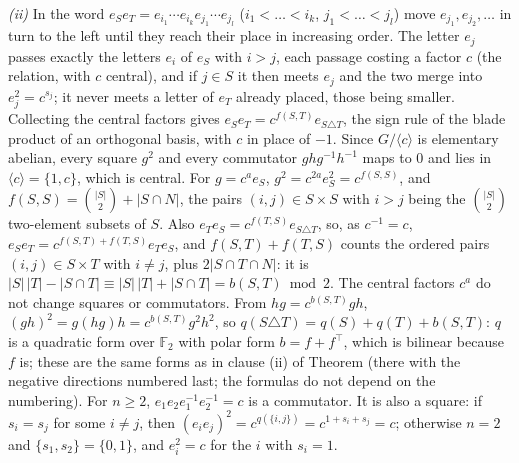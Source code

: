 \emph{(ii)} In the word $e_{S}e_{T} = e_{i_{1}}\cdots e_{i_{k}}e_{j_{1}}\cdots e_{j_{l}}$ ($i_{1} < \dots < i_{k}$, $j_{1} < \dots < j_{l}$) move $e_{j_{1}}, e_{j_{2}}, \dots$ in turn to the left until they reach their place in increasing order. The letter $e_{j}$ passes exactly the letters $e_{i}$ of $e_{S}$ with $i > j$, each passage costing a factor $c$ (the relation, with $c$ central), and if $j \in S$ it then meets $e_{j}$ and the two merge into $e_{j}^{2} = c^{s_{j}}$; it never meets a letter of $e_{T}$ already placed, those being smaller. Collecting the central factors gives $e_{S}e_{T} = c^{f(S,T)}e_{S \triangle T}$, the sign rule of the blade product of an orthogonal basis, with $c$ in place of $-1$. Since $G/\langle c\rangle$ is elementary abelian, every square $g^{2}$ and every commutator $ghg^{-1}h^{-1}$ maps to $0$ and lies in $\langle c\rangle = \{1, c\}$, which is central. For $g = c^{a}e_{S}$, $g^{2} = c^{2a}e_{S}^{2} = c^{f(S,S)}$, and $f(S,S) = \binom{|S|}{2} + |S \cap N|$, the pairs $(i, j) \in S \times S$ with $i > j$ being the $\binom{|S|}{2}$ two-element subsets of $S$. Also $e_{T}e_{S} = c^{f(T,S)}e_{S \triangle T}$, so, as $c^{-1} = c$, $e_{S}e_{T} = c^{f(S,T) + f(T,S)}e_{T}e_{S}$, and $f(S,T) + f(T,S)$ counts the ordered pairs $(i, j) \in S \times T$ with $i \ne j$, plus $2|S \cap T \cap N|$: it is $|S|\,|T| - |S \cap T| \equiv |S|\,|T| + |S \cap T| = b(S,T) \bmod 2$. The central factors $c^{a}$ do not change squares or commutators. From $hg = c^{b(S,T)}gh$, $(gh)^{2} = g(hg)h = c^{b(S,T)}g^{2}h^{2}$, so $q(S \triangle T) = q(S) + q(T) + b(S,T)$: $q$ is a quadratic form over $\mathbb{F}_{2}$ with polar form $b = f + f^{\top}$, which is bilinear because $f$ is; these are the same forms as in clause (ii) of Theorem  (there with the negative directions numbered last; the formulas do not depend on the numbering). For $n \ge 2$, $e_{1}e_{2}e_{1}^{-1}e_{2}^{-1} = c$ is a commutator. It is also a square: if $s_{i} = s_{j}$ for some $i \ne j$, then $(e_{i}e_{j})^{2} = c^{q(\{i, j\})} = c^{1 + s_{i} + s_{j}} = c$; otherwise $n = 2$ and $\{s_{1}, s_{2}\} = \{0, 1\}$, and $e_{i}^{2} = c$ for the $i$ with $s_{i} = 1$.

